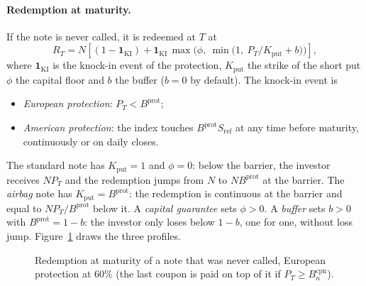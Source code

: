 \documentclass[11pt,a4paper]{article}
\newcommand{\ind}{\mathbf{1}}
\newcommand{\Sref}{S_{\mathrm{ref}}}
\begin{document}
\paragraph{Redemption at maturity.} If the note is never called, it is redeemed at $T$ at
\begin{equation}\label{eq:redemption}
R_T = N\left[(1 - \ind_{\mathrm{KI}}) + \ind_{\mathrm{KI}}\,\max\!\Big(\phi,\ \min\big(1,\ P_T/K_{\mathrm{put}} + b\big)\Big)\right],
\end{equation}
where $\ind_{\mathrm{KI}}$ is the knock-in event of the protection, $K_{\mathrm{put}}$ the strike of the short put
$\phi$ the capital floor and $b$ the buffer ($b = 0$ by default). The knock-in event is
\begin{itemize}
\item \emph{European protection}: $P_T < B^{\mathrm{prot}}$;
\item \emph{American protection}: the index touches $B^{\mathrm{prot}}\Sref$ at any time before maturity,
continuously or on daily closes.
\end{itemize}
The standard note has $K_{\mathrm{put}} = 1$ and $\phi = 0$: below the barrier, the investor receives
$N P_T$ and the redemption jumps from $N$ to $N B^{\mathrm{prot}}$ at the barrier. The \emph{airbag} note has
$K_{\mathrm{put}} = B^{\mathrm{prot}}$: the redemption is continuous at the barrier and equal to
$N P_T / B^{\mathrm{prot}}$ below it. A \emph{capital guarantee} sets $\phi > 0$. A \emph{buffer} sets $b > 0$ with $B^{\mathrm{prot}} = 1 - b$: the investor only loses below $1 - b$, one for one, without loss jump. Figure~\ref{fig:redemption}
draws the three profiles.

\begin{figure}[h]
\centering
{}
\caption{Redemption at maturity of a note that was never called, European protection at 60\% (the last coupon is
paid on top of it if $P_T \ge B^{\mathrm{cpn}}_n$).}
\label{fig:redemption}
\end{figure}
\end{document}
